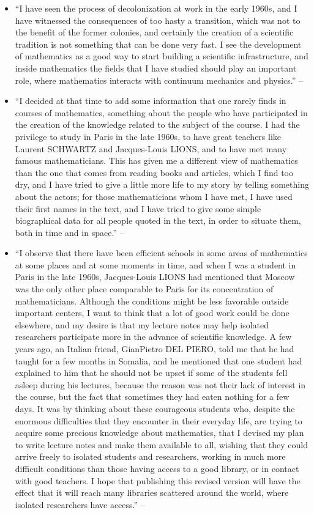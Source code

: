 \documentclass{article}
\numberwithin{equation}{section}
\begin{document}
\begin{enumerate}
\begin{itemize}
		\item ``I have seen the process of decolonization at work in the early 1960s, and I have witnessed the consequences of too hasty a transition, which was not to the benefit of the former colonies, and certainly the creation of a scientific tradition is not something that can be done very fast. I see the development of mathematics as a good way to start building a scientific infrastructure, and inside mathematics the fields that I have studied should play an important role, where mathematics interacts with continuum mechanics and physics.'' -- \cite[Preface, pp. ix--x]{Tartar2006}
		\item ``I decided at that time to add some information that one rarely finds in courses of mathematics, something about the people who have participated in the creation of the knowledge related to the subject of the course. I had the privilege to study in Paris in the late 1960s, to have great teachers like Laurent SCHWARTZ and Jacques-Louis LIONS, and to have met many famous mathematicians. This has given me a different view of mathematics than the one that comes from reading books and articles, which I find too dry, and I have tried to give a little more life to my story by telling something about the actors; for those mathematicians whom I have met, I have used their first names in the text, and I have tried to give some simple biographical data for all people quoted in the text, in order to situate them, both in time and in space.'' -- \cite[Preface, p. x]{Tartar2006}
		\item ``I observe that there have been efficient schools in some areas of mathematics at some places and at some moments in time, and when I was a student in Paris in the late 1960s, Jacques-Louis LIONS had mentioned that Moscow was the only other place comparable to Paris for its concentration of mathematicians. Although the conditions might be less favorable outside important centers, I want to think that a lot of good work could be done elsewhere, and my desire is that my lecture notes may help isolated researchers participate more in the advance of scientific knowledge. A few years ago, an Italian friend, GianPietro DEL PIERO, told me that he had taught for a few months in Somalia, and he mentioned that one student had explained to him that he should not be upset if some of the students fell asleep during his lectures, because the reason was not their lack of interest in the course, but the fact that sometimes they had eaten nothing for a few days. It was by thinking about these courageous students who, despite the enormous difficulties that they encounter in their everyday life, are trying to acquire some precious knowledge about mathematics, that I devised my plan to write lecture notes and make them available to all, wishing that they could arrive freely to isolated students and researchers, working in much more difficult conditions than those having access to a good library, or in contact with good teachers. I hope that publishing this revised version will have the effect that it will reach many libraries scattered around the world, where isolated researchers have access.'' -- \cite[Preface, p. xi]{Tartar2006}

\end{itemize}
\end{enumerate}
\end{document}
